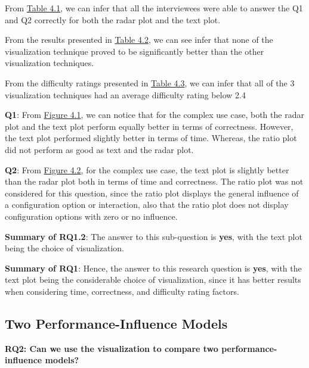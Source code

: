\begin{description}[leftmargin=0pt]
\item[Correctness: ] From \hyperref[table:correctness]{Table 4.1}, we can infer that all the interviewees were able to answer the Q1 and Q2 correctly for both the radar plot and the text plot. 

\item[Time Measurements: ] From the results presented in \hyperref[table:time]{Table 4.2}, we can see infer that none of the visualization technique proved to be significantly better than the other visualization techniques. 

\item[Difficulty Ratings: ] From the difficulty ratings presented in \hyperref[table:rating]{Table 4.3}, we can infer that all of the 3 visualization techniques had an average difficulty rating below 2.4
\end{description}

\textbf{Q1}: From \hyperref[figure:paretoOneQ1]{Figure 4.1}, we can notice that for the complex use case, both the radar plot and the text plot perform equally better in terms of correctness. However, the text plot performed slightly better in terms of time. Whereas, the ratio plot did not perform as good as text and the radar plot.

\textbf{Q2}: From \hyperref[figure:paretoOneQ2]{Figure 4.2}, for the complex use case, the text plot is slightly better than the radar plot both in terms of time and correctness. The ratio plot was not considered for this question, since the ratio plot displays the general influence of a configuration option or interaction, also that the ratio plot does not display configuration options with zero or no influence.

\textbf{Summary of RQ1.2}: The answer to this sub-question is \textbf{yes}, with the text plot being the choice of visualization.

\textbf{Summary of RQ1}: Hence, the answer to this research question is \textbf{yes}, with the text plot being the considerable choice of visualization, since it has better results when considering time, correctness, and difficulty rating factors.

\subsection*{Two Performance-Influence Models}
\vskip 0.2in
\begin{mdframed}
\textbf{RQ2: Can we use the visualization to compare two performance-influence models?}
\end{mdframed}


